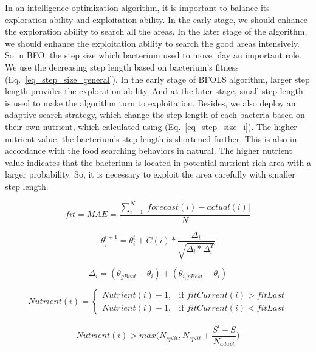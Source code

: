 \documentclass[runningheads]{llncs}
\begin{document}
In an intelligence optimization algorithm, it is important to balance its exploration ability and exploitation ability. In the early stage, we should enhance the exploration ability to search all the areas. In the later stage of the algorithm, we should enhance the exploitation ability to search the good areas intensively. So in BFO, the step size which bacterium used to move play an important role. We use the decreasing step length based on bacterium's fitness (Eq.~\ref{eq_step_size_general}). In the early stage of BFOLS algorithm, larger step length provides the exploration ability. And at the later stage, small step length is used to make the algorithm turn to exploitation. Besides, we also deploy an adaptive search strategy, which change the step length of each bacteria based on their own nutrient, which calculated using (Eq.~\ref{eq_step_size_i}). The higher nutrient value, the bacterium’s step length is shortened further. This is also in accordance with the food searching behaviors in natural. The higher nutrient value indicates that the bacterium is located in potential nutrient rich area with a larger probability. So, it is necessary to exploit the area carefully with smaller step length.




\small
\begin{equation} \label{eq_mae}
fit = MAE = \frac{\sum_{i=1}^N|forecast(i) - actual(i)|}{N}
\end{equation}

\begin{equation} \label{eq_position}
\theta^{t+1}_i = \displaystyle \theta^t_i + C(i) * \frac{\Delta_i}{ \sqrt{ \Delta_i * \Delta^T_i } } 
\end{equation}

\begin{equation} \label{eq_social}
\Delta_i = ( \theta_{gBest} - \theta_i ) + ( \theta_{i,pBest} - \theta_i ) 
\end{equation}

\begin{equation} \label{eq_nutrition}
Nutrient(i) = \begin{cases}  Nutrient(i) + 1, & \mbox{if } fitCurrent(i) > fitLast\\ Nutrient(i) - 1, & \mbox{if } fitCurrent(i) < fitLast \end{cases}
\end{equation}

\begin{equation} \label{eq_split}
Nutrient(i) > \displaystyle max\Big( N_{split}, N_{split} + \frac{S^i - S}{ N_{adapt} } \Big)
\end{equation}
\end{document}
